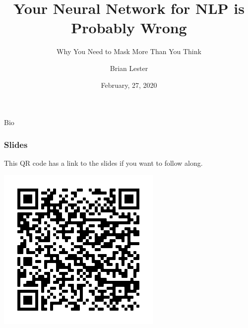 \documentclass{beamer}
\title{Your Neural Network for NLP is Probably Wrong}
\subtitle{Why You Need to Mask More Than You Think}
\author{Brian Lester}
\institute{Interactions}
\date{February, 27, 2020}
\begin{document}
\frame{\titlepage}
\begin{section}{Bio}

    \begin{frame}
        \frametitle{Slides}
        This QR code has a link to the slides if you want to follow along.
        \begin{center}
            \includegraphics[height=0.8\textheight]{images/qr.png}
        \end{center}
    \end{frame}


\end{section}
\end{document}

